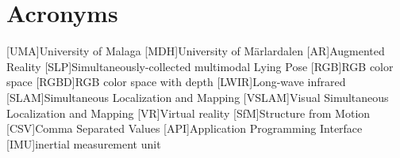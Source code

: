 \section*{Acronyms}
\begin{acronym}[MPC] %
    [UMA]{University of Malaga}
    [MDH]{University of Märlardalen}
    [AR]{Augmented Reality}
    [SLP]{Simultaneously-collected multimodal Lying Pose}
    [RGB]{RGB color space}
    [RGBD]{RGB color space with depth}
    [LWIR]{Long-wave infrared}
    [SLAM]{Simultaneous Localization and Mapping}
    [VSLAM]{Visual Simultaneous Localization and Mapping}
    [VR]{Virtual reality}
    [SfM]{Structure from Motion}
    [CSV]{Comma Separated Values}
    [API]{Application Programming Interface}
    [IMU]{inertial measurement unit}
\end{acronym}

\newpage